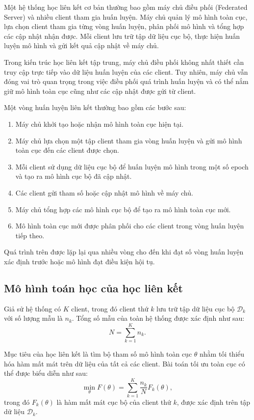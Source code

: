 Một hệ thống học liên kết cơ bản thường bao gồm máy chủ điều phối (Federated Server) và nhiều
client tham gia huấn luyện. Máy chủ quản lý mô hình toàn cục, lựa chọn client tham gia từng vòng
huấn luyện, phân phối mô hình và tổng hợp các cập nhật nhận được. Mỗi client lưu trữ tập dữ liệu
cục bộ, thực hiện huấn luyện mô hình và gửi kết quả cập nhật về máy chủ.

Trong kiến trúc học liên kết tập trung, máy chủ điều phối không nhất thiết cần truy cập trực tiếp
vào dữ liệu huấn luyện của các client. Tuy nhiên, máy chủ vẫn đóng vai trò quan trọng trong việc
điều phối quá trình huấn luyện và có thể nắm giữ mô hình toàn cục cũng như các cập nhật được gửi từ
client.

Một vòng huấn luyện liên kết thường bao gồm các bước sau:

\begin{enumerate}
	\item Máy chủ khởi tạo hoặc nhận mô hình toàn cục hiện tại.
	\item Máy chủ lựa chọn một tập client tham gia vòng huấn luyện và gửi mô hình toàn cục đến các client
	      được chọn.
	\item Mỗi client sử dụng dữ liệu cục bộ để huấn luyện mô hình trong một số epoch và tạo ra mô hình cục bộ
	      đã cập nhật.
	\item Các client gửi tham số hoặc cập nhật mô hình về máy chủ.
	\item Máy chủ tổng hợp các mô hình cục bộ để tạo ra mô hình toàn cục mới.
	\item Mô hình toàn cục mới được phân phối cho các client trong vòng huấn luyện tiếp theo.
\end{enumerate}

Quá trình trên được lặp lại qua nhiều vòng cho đến khi đạt số vòng huấn luyện xác định trước hoặc
mô hình đạt điều kiện hội tụ.

\subsection{Mô hình toán học của học liên kết}

Giả sử hệ thống có $K$ client, trong đó client thứ $k$ lưu trữ tập dữ liệu cục bộ $\mathcal{D}_k$
với số lượng mẫu là $n_k$. Tổng số mẫu của toàn hệ thống được xác định như sau:
\[
	N = \sum_{k=1}^{K} n_k.
\]

Mục tiêu của học liên kết là tìm bộ tham số mô hình toàn cục $\theta$ nhằm tối thiểu hóa hàm mất
mát trên dữ liệu của tất cả các client. Bài toán tối ưu toàn cục có thể được biểu diễn như sau:
\[
	\min_{\theta} F(\theta)
	= \sum_{k=1}^{K} \frac{n_k}{N} F_k(\theta),
\]
trong đó $F_k(\theta)$ là hàm mất mát cục bộ của client thứ $k$, được xác định trên tập dữ liệu
$\mathcal{D}_k$.

